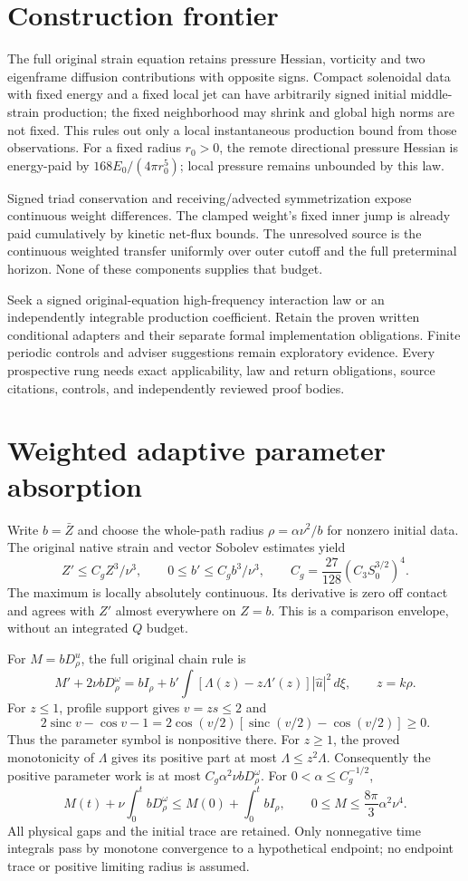 \documentclass[11pt]{article}
\begin{document}
\section{Construction frontier}
The full original strain equation retains pressure Hessian, vorticity and
two eigenframe diffusion contributions with opposite signs. Compact
solenoidal data with fixed energy and a fixed local jet can have arbitrarily signed initial
middle-strain production; the fixed neighborhood may shrink and global high
norms are not fixed. This rules out only a local instantaneous production
bound from those observations. For a fixed radius $r_0>0$, the remote
directional pressure Hessian is energy-paid by
$168E_0/(4\pi r_0^5)$; local pressure remains unbounded by this law.

Signed triad conservation and receiving/advected symmetrization expose
continuous weight differences. The clamped weight's fixed inner jump is
already paid cumulatively by kinetic net-flux bounds. The unresolved source
is the continuous weighted transfer uniformly over outer cutoff and the
full preterminal horizon. None of these components supplies that budget.

Seek a signed original-equation high-frequency interaction law or an
independently integrable production coefficient. Retain the proven written
conditional adapters and their separate formal implementation obligations.
Finite periodic controls and adviser suggestions remain exploratory evidence.
Every prospective rung needs exact applicability, law and return obligations,
source citations, controls, and independently reviewed proof bodies.
\section{Weighted adaptive parameter absorption}
Write $b=\bar Z$ and choose the whole-path radius
$\rho=\alpha\nu^2/b$ for nonzero initial data. The original native
strain and vector Sobolev estimates yield
\[
 Z'\le C_gZ^3/\nu^3,\qquad
 0\le b'\le C_gb^3/\nu^3,\qquad
 C_g=\frac{27}{128}(C_3S_0^{3/2})^4.
\]
The maximum is locally absolutely continuous. Its derivative is zero
off contact and agrees with $Z'$ almost everywhere on $Z=b$.
This is a comparison envelope, without an integrated $Q$ budget.

For $M=bD^u_\rho$, the full original chain rule is
\[
 M'+2\nu bD^\omega_\rho
 =bI_\rho+b'\int[\Lambda(z)-z\Lambda'(z)]|\widehat u|^2\,d\xi,
 \qquad z=k\rho.
\]
For $z\le1$, profile support gives $v=zs\le2$ and
\[
 2\operatorname{sinc}v-\cos v-1
 =2\cos(v/2)[\operatorname{sinc}(v/2)-\cos(v/2)]\ge0.
\]
Thus the parameter symbol is nonpositive there. For $z\ge1$, the
proved monotonicity of $\Lambda$ gives its positive part at most
$\Lambda\le z^2\Lambda$. Consequently the positive parameter work
is at most $C_g\alpha^2\nu bD^\omega_\rho$. For
$0<\alpha\le C_g^{-1/2}$,
\[
 M(t)+\nu\int_0^t bD^\omega_\rho
 \le M(0)+\int_0^t bI_\rho,
 \qquad 0\le M\le\frac{8\pi}{3}\alpha^2\nu^4.
\]
All physical gaps and the initial trace are retained. Only nonnegative
time integrals pass by monotone convergence to a hypothetical endpoint;
no endpoint trace or positive limiting radius is assumed.
\end{document}
